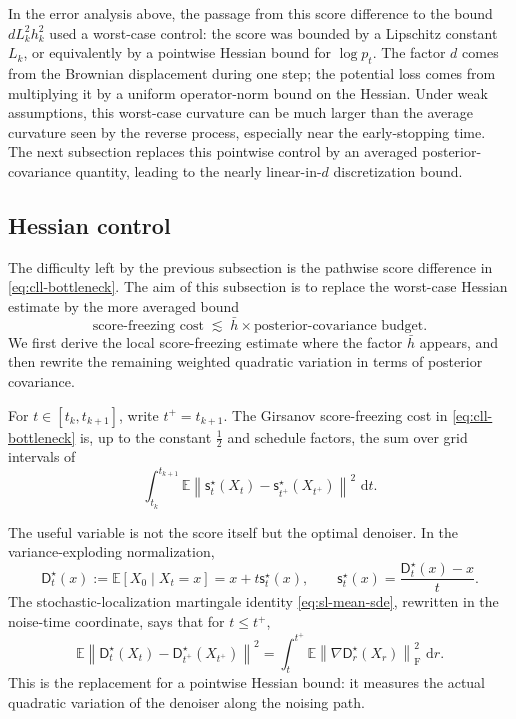 \documentclass[10pt,a4paper]{amsart}
\numberwithin{equation}{section}
\newcommand{\E}{\mathbb{E}}
\newcommand{\dd}{\,\mathrm{d}}
\newcommand{\norm}[1]{\left\lVert #1 \right\rVert}
\newcommand{\sstar}{\mathsf{s}^{\star}}
\newcommand{\dstar}{\mathsf{D}^{\star}}
\begin{document}
In the error analysis above, the passage from this score difference to the bound
$dL_k^2h_k^2$ used a worst-case control: the score was bounded by a Lipschitz
constant $L_k$, or equivalently by a pointwise Hessian bound for $\log p_t$.
The factor $d$ comes from the Brownian displacement during one step; the
potential loss comes from multiplying it by a uniform operator-norm bound on
the Hessian.  Under weak assumptions, this worst-case curvature can be much
larger than the average curvature seen by the reverse process, especially near
the early-stopping time.  The next subsection replaces this pointwise control
by an averaged posterior-covariance quantity, leading to the
nearly linear-in-$d$ discretization bound.

\subsection{Hessian control}
\label{subsec:denoiser-D-delta-T}

The difficulty left by the previous subsection is the pathwise score difference
in \eqref{eq:cll-bottleneck}.  The aim of this subsection is to replace the
worst-case Hessian estimate by the more averaged bound
\[
    \text{score-freezing cost}
    \;\lesssim\;
    \bar h
    \times
    \text{posterior-covariance budget}.
\]
We first derive the local score-freezing estimate where the factor $\bar h$
appears, and then rewrite the remaining weighted quadratic variation in terms
of posterior covariance.

For $t\in[t_k,t_{k+1}]$, write $t^+=t_{k+1}$.  The Girsanov
score-freezing cost in \eqref{eq:cll-bottleneck} is, up to the constant
$\frac12$ and schedule factors, the sum over grid intervals of
\[
    \int_{t_k}^{t_{k+1}}
    \E\norm{
        \sstar_t(X_t)-\sstar_{t^+}(X_{t^+})
    }^2\,\dd t.
\]

The useful variable is not the score itself but the optimal denoiser.  In the
variance-exploding normalization,
\[
    \dstar_t(x):=\E[X_0\mid X_t=x]=x+t\sstar_t(x),
    \qquad
    \sstar_t(x)=\frac{\dstar_t(x)-x}{t}.
\]
The stochastic-localization martingale identity
\eqref{eq:sl-mean-sde}, rewritten in the noise-time coordinate, says that for
$t\leq t^+$,
\[
    \E\norm{
    \dstar_t(X_t)-\dstar_{t^+}(X_{t^+})
    }^2
    =
    \int_t^{t^+}
    \E\norm{\nabla \dstar_r(X_r)}_{\mathrm F}^2\,\dd r.
\]
This is the replacement for a pointwise Hessian bound: it measures the actual
quadratic variation of the denoiser along the noising path.
\end{document}

